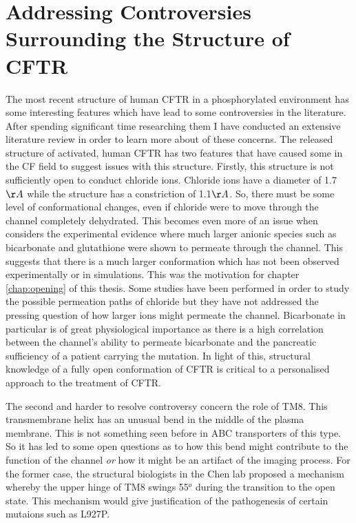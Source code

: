 \section{Addressing Controversies Surrounding the Structure of CFTR}
The most recent structure of human CFTR in a phosphorylated environment has some interesting features which have lead to some controversies in the literature. After spending significant time researching them I have conducted an extensive literature review in order to learn more about of these concerns. The released structure of activated, human CFTR has two features that have caused some in the CF field to suggest issues with this structure. Firstly, this structure is not sufficiently open to conduct chloride ions. Chloride ions have a diameter of 1.7$\AA$ while the structure has a constriction of 1.1$\AA$\cite{Zhang2018}. So, there must be some level of conformational changes, even if chloride were to move through the channel completely dehydrated. This becomes even more of an issue when considers the experimental evidence where much larger anionic species such as bicarbonate and glutathione were shown to permeate through the channel\cite{kogan2003}. This suggests that there is a much larger conformation which has not been observed experimentally or in simulations. This was the motivation for chapter \ref{chap:opening} of this thesis. Some studies have been performed in order to study the possible permeation paths of chloride but they have not addressed the pressing question of how larger ions might permeate the channel. Bicarbonate in particular is of great physiological importance as there is a high correlation between the channel's ability to permeate bicarbonate and the pancreatic sufficiency of a patient carrying the mutation. In light of this, structural knowledge of a fully open conformation of CFTR is critical to a personalised approach to the treatment of CFTR.

The second and harder to resolve controversy concern the role of TM8. This transmembrane helix has an unusual bend in the middle of the plasma membrane. This is not something seen before in ABC transporters of this type. So it has led to some open questions as to how this bend might contribute to the function of the channel \textit{or} how it might be an artifact of the imaging process. For the former case, the structural biologists in the Chen lab proposed a mechanism whereby the upper hinge of TM8 swings 55$^o$ during the transition to the open state. This mechanism would give justification of the pathogenesis of certain mutaions such as L927P. 

